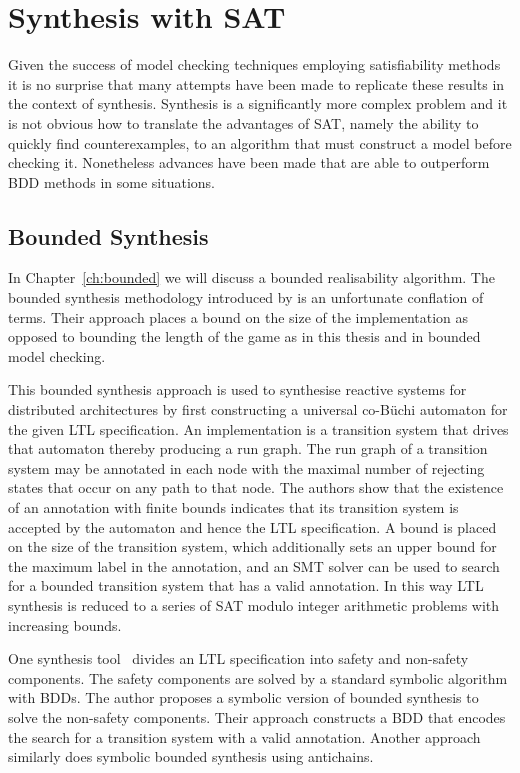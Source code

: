 \section{Synthesis with SAT}

Given the success of model checking techniques employing satisfiability methods it is no surprise that many attempts have been made to replicate these results in the context of synthesis. Synthesis is a significantly more complex problem and it is not obvious how to translate the advantages of SAT, namely the ability to quickly find counterexamples, to an algorithm that must construct a model before checking it. Nonetheless advances have been made that are able to outperform BDD methods in some situations.

\subsection{Bounded Synthesis}

In Chapter~\ref{ch:bounded} we will discuss a bounded realisability algorithm. The bounded synthesis methodology introduced by \cite{Finkbeiner13} is an unfortunate conflation of terms. Their approach places a bound on the size of the implementation as opposed to bounding the length of the game as in this thesis and in bounded model checking. 

This bounded synthesis approach is used to synthesise reactive systems for distributed architectures by first constructing a universal co-B\"uchi automaton for the given LTL specification. An implementation is a transition system that drives that automaton thereby producing a run graph. The run graph of a transition system may be annotated in each node with the maximal number of rejecting states that occur on any path to that node. The authors show that the existence of an annotation with finite bounds indicates that its transition system is accepted by the automaton and hence the LTL specification. A bound is placed on the size of the transition system, which additionally sets an upper bound for the maximum label in the annotation, and an SMT solver can be used to search for a bounded transition system that has a valid annotation. In this way LTL synthesis is reduced to a series of SAT modulo integer arithmetic problems with increasing bounds.

One synthesis tool~\cite{Ehlers12} divides an LTL specification into safety and non-safety components. The safety components are solved by a standard symbolic algorithm with BDDs. The author proposes a symbolic version of bounded synthesis to solve the non-safety components. Their approach constructs a BDD that encodes the search for a transition system with a valid annotation. Another approach~\cite{Filiot11} similarly does symbolic bounded synthesis using antichains.


